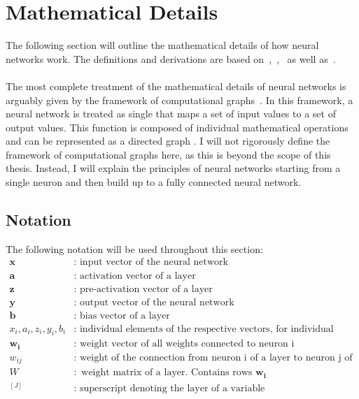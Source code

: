 \section{Mathematical Details}
\label{sec:nn-mathematical-details}
The following section will outline the mathematical details of how neural networks work.
The definitions and derivations are based on~\cite[chapter 1.2-1.3]{aggarwal_neural_2018},~\cite[chapter 5-6]{goodfellow_deep_2016},~\cite{ibm_nn} as well as~\cite[chapter 4.4]{haykin_neural_1998}.
\\
\\
The most complete treatment of the mathematical details of neural networks is arguably given by the framework of computational graphs~\cite{bettilyon_computationalgraphs_2020}.
In this framework, a neural network is treated as single that maps a set of input values to a set of output values.
This function is composed of individual mathematical operations and can be represented as a directed graph \cite[section 1.4]{haykin_neural_1998}.
I will not rigorously define the framework of computational graphs here, as this is beyond the scope of this thesis.
Instead, I will explain the principles of neural networks starting from a single neuron and then build up to a fully connected neural network.
\subsection{Notation}
\label{subsec:nn-notation}
The following notation will be used throughout this section:
\begin{equation*}
    \begin{array}{ll}
    \bm{x} & : \text { input vector of the neural network} \\
    \bm{a} & : \text { activation vector of a layer} \\
    \bm{z} & : \text { pre-activation vector of a layer} \\
    \bm{y} & : \text { output vector of the neural network} \\
    \bm{b} & : \text { bias vector of a layer} \\
    x_i, a_i, z_i, y_i, b_i & : \text { individual elements of the respective vectors, for individual nodes } \\
    \bm{w_i} & : \text { weight vector of all weights connected to neuron i} \\
    w_{ij} & : \text { weight of the connection from neuron i of a layer to neuron j of the previous layer } \\
    W & : \text { weight matrix of a layer. Contains rows $\bm{w_i}$} \\
    ^{[J]} & : \text { superscript denoting the layer of a variable} \\
    \end{array}
\end{equation*}
